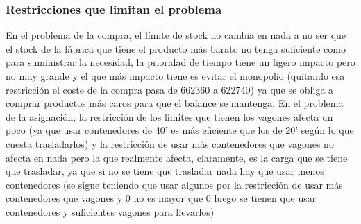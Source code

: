 \documentclass[11pt,spanish]{article}
\begin{document}
			\subsubsection{Restricciones que limitan el problema}
			En el problema de la compra, el límite de stock no cambia en nada a no ser que el stock de la fábrica que tiene el producto más barato no tenga suficiente como para suministrar la necesidad, la prioridad de tiempo tiene un ligero impacto pero no muy grande y el que más impacto tiene es evitar el monopolio (quitando esa restricción el coste de la compra pasa de 662360 a 622740) ya que se obliga a comprar productos más caros para que el balance se mantenga.
			En el problema de la asignación, la restricción de los límites que tienen los vagones afecta un poco (ya que usar contenedores de 40' es más eficiente que los de 20' según lo que cuesta trasladarlos) y la restricción de usar más contenedores que vagones no afecta en nada pero la que realmente afecta, claramente, es la carga que se tiene que trasladar, ya que si no se tiene que trasladar nada hay que usar menos contenedores (se sigue teniendo que usar algunos por la restricción de usar más contenedores que vagones y 0 no es mayor que 0 luego se tienen que usar contenedores y suficientes vagones para llevarlos)
\end{document}
